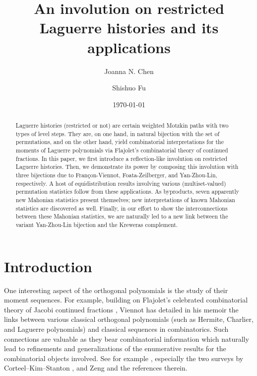 \documentclass[12pt]{amsart}
\numberwithin{equation}{section}
\theoremstyle{plain}
\theoremstyle{definition}
\begin{document}
\title[An involution on restricted Laguerre histories and its
applications]{An involution on restricted Laguerre histories and its
applications}

\author[J.~N.~Chen]{Joanna N. Chen}
\address{College of Science, Tianjin University of Technology, Tianjin 300384, P.R. China.}

\author[S.~Fu]{Shishuo Fu}
\address{College of Mathematics and Statistics, Chongqing University, Chongqing 401331, P.R. China.}

\date{\today}


\begin{abstract}
Laguerre histories (restricted or not) are certain weighted Motzkin paths with two types of level steps. They are, on one hand, in natural bijection with the set of permutations, and on the other hand, yield combinatorial interpretations for the moments of Laguerre polynomials via Flajolet's combinatorial theory of continued fractions. In this paper, we first introduce a reflection-like involution on restricted Laguerre histories. Then, we demonstrate its power by composing this involution with three bijections due to Fran\c con-Viennot,  Foata-Zeilberger, and Yan-Zhou-Lin, respectively. A host of equidistribution results involving various (multiset-valued) permutation statistics follow from these applications. As byproducts, seven apparently new Mahonian statistics present themselves; new interpretations of known Mahonian statistics are discovered as well. Finally, in our effort to show the interconnections between these Mahonian statistics, we are naturally led to a new link between the variant Yan-Zhou-Lin bijection and the Kreweras complement.
\end{abstract}

\keywords{}

\maketitle




\section{Introduction}\label{sec:intro}


One interesting aspect of the orthogonal polynomials is the study of their moment sequences. For example, building on Flajolet's celebrated combinatorial theory of Jacobi continued fractions \cite{Fla}, Viennot has detailed in his memoir \cite{Vie} the links between various classical orthogonal polynomials (such as Hermite, Charlier, and Laguerre polynomials) and classical sequences in combinatorics. Such connections are valuable as they bear combinatorial information which naturally lead to refinements and generalizations of the enumerative results for the combinatorial objects involved. See for example \cite{CSZ,Cor,FV,FZ90,SS,KZ,SZ12,YZL,HMZ}, especially the two surveys by Corteel--Kim--Stanton \cite{CKS}, and Zeng \cite{Zen} and the references therein.
\end{document}

